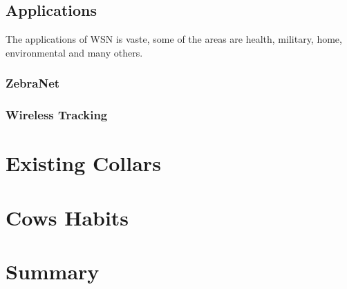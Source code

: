 
\subsection{Applications}
\label{subsec:wsn_applications}
The applications of WSN is vaste, some of the areas are health, military, home, environmental
and many others.


\subsubsection{ZebraNet}
\label{subsubsection:zebranet}

\subsubsection{Wireless Tracking}
\label{subsubsection:wireless_tracking}


\section{Existing Collars}
\label{sec:existing_collars}

\section{Cows Habits}
\label{sec:cows}

\section{Summary}
\label{sec:summary}
